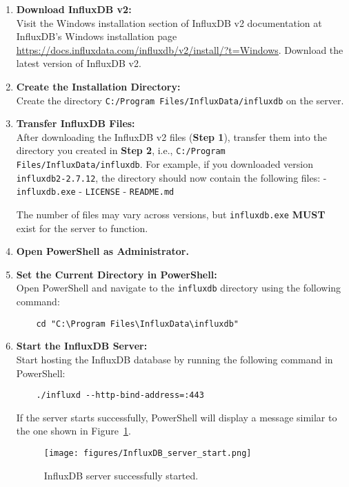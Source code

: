 \documentclass{article}
\begin{document}
\begin{enumerate} 
    \item \textbf{Download InfluxDB v2:}\\
    Visit the Windows installation section of InfluxDB v2 documentation at InfluxDB's Windows installation page \href{https://docs.influxdata.com/influxdb/v2/install/?t=Windows}{\underline{https://docs.influxdata.com/influxdb/v2/install/?t=Windows}}. Download the latest version of InfluxDB v2.
        
    \item \textbf{ Create the Installation Directory:}\\
    Create the directory \texttt{C:/Program Files/InfluxData/influxdb} on the server.
    
    \item \textbf{Transfer InfluxDB Files:}\\  
    After downloading the InfluxDB v2 files (\textbf{Step 1}), transfer them into the directory you created in \textbf{Step 2}, i.e., \texttt{C:/Program Files/InfluxData/influxdb}. For example, if you downloaded version \texttt{influxdb2-2.7.12}, the directory should now contain the following files:  
    - \texttt{influxdb.exe}  
    - \texttt{LICENSE}  
    - \texttt{README.md}  
    
    The number of files may vary across versions, but \texttt{influxdb.exe} \textbf{MUST} exist for the server to function.

    \item \textbf{Open PowerShell as Administrator.}
    
    \item \textbf{Set the Current Directory in PowerShell:}\\  
    Open PowerShell and navigate to the \texttt{influxdb} directory using the following command:  
    \begin{verbatim}
    cd "C:\Program Files\InfluxData\influxdb"
    \end{verbatim}
    
    \item \textbf{Start the InfluxDB Server:}\\  
    Start hosting the InfluxDB database by running the following command in PowerShell:  
    \begin{verbatim}
    ./influxd --http-bind-address=:443
    \end{verbatim}

    If the server starts successfully, PowerShell will display a message similar to the one shown in Figure~\ref{fig:InfluxDBstart}.    
    \begin{figure}[h]
    \centering
    \texttt{[image: figures/InfluxDB\_server\_start.png]}
    \caption{InfluxDB server successfully started.}
    \label{fig:InfluxDBstart}
    \end{figure}


\end{enumerate}
\end{document}
